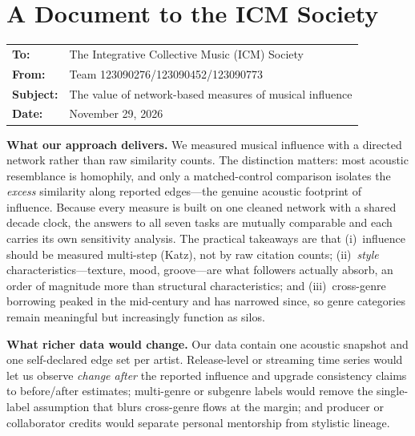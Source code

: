 \documentclass[11pt,letterpaper]{article}
\numberwithin{equation}{section}
\begin{document}
\newpage
\section*{A Document to the ICM Society}
\label{sec:memo}
\noindent\begin{tabular}{@{}ll@{}}
  \textbf{To:}      & The Integrative Collective Music (ICM) Society \\
  \textbf{From:}    & Team 123090276/123090452/123090773 \\
  \textbf{Subject:} & The value of network-based measures of musical influence \\
  \textbf{Date:}    & November 29, 2026 \\
\end{tabular}

\medskip
\noindent\textbf{What our approach delivers.} We measured musical
influence with a directed network rather than raw similarity counts. The
distinction matters: most acoustic resemblance is homophily, and only a
matched-control comparison isolates the \emph{excess} similarity along
reported edges---the genuine acoustic footprint of influence. Because
every measure is built on one cleaned network with a shared decade clock,
the answers to all seven tasks are mutually comparable and each carries
its own sensitivity analysis. The practical takeaways are that
(i)~influence should be measured multi-step (Katz), not by raw citation
counts; (ii)~\emph{style} characteristics---texture, mood,
groove---are what followers actually absorb, an order of magnitude more
than structural characteristics; and (iii)~cross-genre borrowing peaked
in the mid-century and has narrowed since, so genre categories remain
meaningful but increasingly function as silos.

\noindent\textbf{What richer data would change.} Our data contain one
acoustic snapshot and one self-declared edge set per artist. Release-level
or streaming time series would let us observe \emph{change after} the
reported influence and upgrade consistency claims to before/after
estimates; multi-genre or subgenre labels would remove the single-label
assumption that blurs cross-genre flows at the margin; and producer or
collaborator credits would separate personal mentorship from stylistic
lineage.
\end{document}
